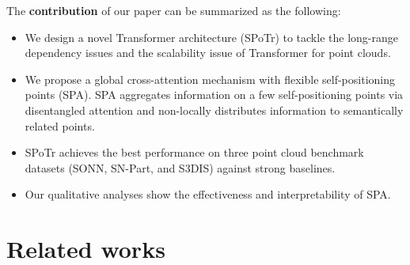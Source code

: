 \documentclass[10pt,twocolumn,letterpaper]{article}
\begin{document}
The \textbf{contribution} of our paper can be summarized as the following:
\begin{itemize}
    \item[\textbullet] We design a novel Transformer architecture (SPoTr) to tackle the long-range dependency issues and the scalability issue of Transformer for point clouds.
    \item[\textbullet] We propose a global cross-attention mechanism with flexible self-positioning points (SPA). SPA aggregates information on a few self-positioning points via disentangled attention and non-locally distributes information to semantically related points.
    \item[\textbullet] SPoTr achieves the best performance on three point cloud benchmark datasets (SONN, SN-Part, and S3DIS) against strong baselines.
    \item[\textbullet] Our qualitative analyses show the effectiveness and interpretability of SPA.
\end{itemize}






















%
 \section{Related works}
    \label{sec:2}
\end{document}
